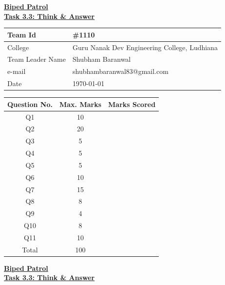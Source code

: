 \documentclass[a4paper,12pt]{article}
\author{e-Yantra Team} %
\date{\normalsize\today} %
\begin{document}
\begin{center}
	\bf \Huge \underline{\textbf{Biped Patrol}} \\
	\vspace{5mm}
	\Large \underline {\textbf{Task 3.3: Think \& Answer}}\\
\end{center}
\vspace{5mm}
\begin{center}
	\begin{tabular}{|p{5cm}|p{10cm}|}
		\hline
		Team Id & \#1110 \\
		\hline
		College &  Guru Nanak Dev Engineering College, Ludhiana\\
		\hline
		Team Leader Name & Shubham Baranwal \\
		\hline
		e-mail & shubhambaranwal83@gmail.com \\
		\hline
		Date & \today \\
		\hline
	\end{tabular}
\end{center}
\vspace{25mm}
\begin{center}
	\begin{tabular}{|c|c|c|}
		\hline
		Question No. & Max. Marks & Marks Scored \\
		\hline
		Q1 &  10 & \\
		\hline
		Q2 &  20 & \\
		\hline
		Q3 &  5 & \\
		\hline
		Q4 &  5 & \\
		\hline
		Q5 &  5 & \\
		\hline
		Q6 &  10 & \\
		\hline
		Q7 &  15 & \\
		\hline
		Q8 &  8 & \\
		\hline
		Q9 &  4 & \\
		\hline
		Q10 &  8 & \\
		\hline
		Q11 &  10 & \\
		\hline
		Total &  100 & \\
		\hline
	\end{tabular}
\end{center}
\newpage 
\begin{center}
\bf \Huge \underline{\textbf{Biped Patrol}} \\
\vspace{5mm}
\Large \underline {\textbf{Task 3.3: Think \& Answer}}\\
\end{center}
\vspace{1cm}
\end{document}
